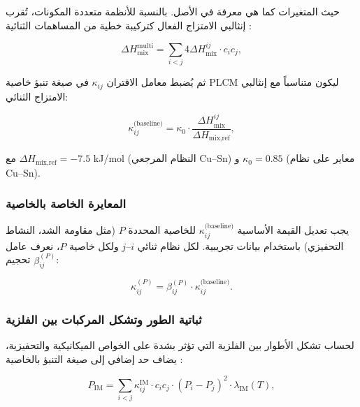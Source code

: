 \documentclass[11pt,a4paper]{article}
\begin{document}
\begin{otherlanguage}{arabic}
		حيث المتغيرات كما هي معرفة في الأصل. بالنسبة للأنظمة متعددة المكونات، تُقرب إنثالبي الامتزاج الفعال كتركيبة خطية من المساهمات الثنائية \cite{Takeuchi2010}:
		
		\begin{equation}
			\Delta H_{\text{mix}}^{\text{multi}} = \sum_{i<j} 4 \Delta H_{\text{mix}}^{ij} \cdot c_i c_j,
			\label{eq:multicomponent}
		\end{equation}
		
		ثم يُضبط معامل الاقتران \(\kappa_{ij}\) في صيغة تنبؤ خاصية PLCM ليكون متناسباً مع إنثالبي الامتزاج الثنائي:
		
		\begin{equation}
			\kappa_{ij}^{\text{(baseline)}} = \kappa_0 \cdot \frac{\Delta H_{\text{mix}}^{ij}}{\Delta H_{\text{mix,ref}}},
			\label{eq:kappa-miedema}
		\end{equation}
		
		مع \(\Delta H_{\text{mix,ref}} = -7.5\) kJ/mol (النظام المرجعي Cu–Sn) و \(\kappa_0 = 0.85\) (معاير على نظام Cu–Sn).
		
		\subsubsection{المعايرة الخاصة بالخاصية}
		
		يجب تعديل القيمة الأساسية \(\kappa_{ij}^{\text{(baseline)}}\) للخاصية المحددة \(P\) (مثل مقاومة الشد، النشاط التحفيزي) باستخدام بيانات تجريبية. لكل نظام ثنائي \(i\)–\(j\) ولكل خاصية \(P\)، نعرف عامل تحجيم \(\beta_{ij}^{(P)}\):
		
		\begin{equation}
			\kappa_{ij}^{(P)} = \beta_{ij}^{(P)} \cdot \kappa_{ij}^{\text{(baseline)}}.
			\label{eq:beta-calibration}
		\end{equation}
		
		\subsubsection{ثباتية الطور وتشكل المركبات بين الفلزية}
		
		لحساب تشكل الأطوار بين الفلزية التي تؤثر بشدة على الخواص الميكانيكية والتحفيزية، يضاف حد إضافي إلى صيغة التنبؤ بالخاصية \cite{Wen2019}:
		
		\begin{equation}
			P_{\text{IM}} = \sum_{i<j} \kappa_{ij}^{\text{IM}} \cdot c_i c_j \cdot (P_i - P_j)^2 \cdot \lambda_{\text{IM}}(T),
			\label{eq:intermetallic}
		\end{equation}
		

\end{otherlanguage}
\end{document}
